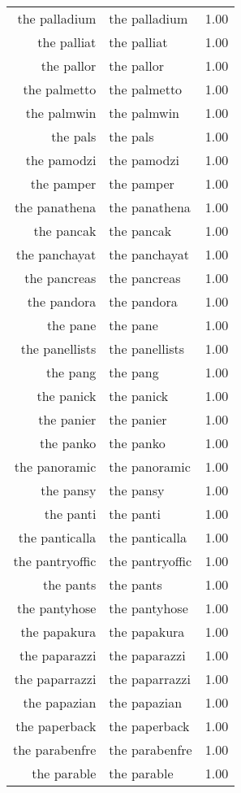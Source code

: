 \begin{table}[ht]
\begin{tabular}{rlr}
  the palladium & the palladium & 1.00 \\ 
  the palliat & the palliat & 1.00 \\ 
  the pallor & the pallor & 1.00 \\ 
  the palmetto & the palmetto & 1.00 \\ 
  the palmwin & the palmwin & 1.00 \\ 
  the pals & the pals & 1.00 \\ 
  the pamodzi & the pamodzi & 1.00 \\ 
  the pamper & the pamper & 1.00 \\ 
  the panathena & the panathena & 1.00 \\ 
  the pancak & the pancak & 1.00 \\ 
  the panchayat & the panchayat & 1.00 \\ 
  the pancreas & the pancreas & 1.00 \\ 
  the pandora & the pandora & 1.00 \\ 
  the pane & the pane & 1.00 \\ 
  the panellists & the panellists & 1.00 \\ 
  the pang & the pang & 1.00 \\ 
  the panick & the panick & 1.00 \\ 
  the panier & the panier & 1.00 \\ 
  the panko & the panko & 1.00 \\ 
  the panoramic & the panoramic & 1.00 \\ 
  the pansy & the pansy & 1.00 \\ 
  the panti & the panti & 1.00 \\ 
  the panticalla & the panticalla & 1.00 \\ 
  the pantryoffic & the pantryoffic & 1.00 \\ 
  the pants & the pants & 1.00 \\ 
  the pantyhose & the pantyhose & 1.00 \\ 
  the papakura & the papakura & 1.00 \\ 
  the paparazzi & the paparazzi & 1.00 \\ 
  the paparrazzi & the paparrazzi & 1.00 \\ 
  the papazian & the papazian & 1.00 \\ 
  the paperback & the paperback & 1.00 \\ 
  the parabenfre & the parabenfre & 1.00 \\ 
  the parable & the parable & 1.00 \\ 

\end{tabular}
\end{table}
